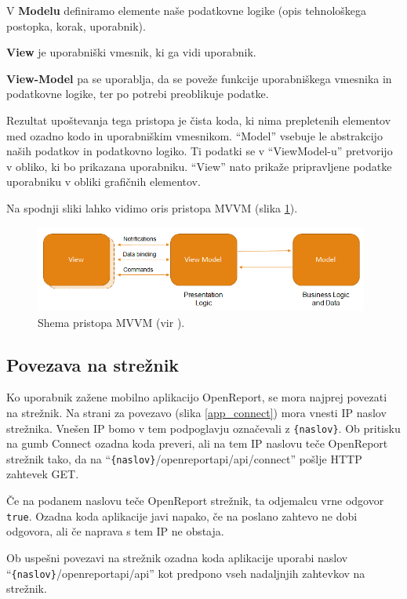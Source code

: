 \documentclass[a4paper, 12pt]{book}
\begin{document}
V \textbf{Modelu} definiramo elemente naše podatkovne logike (opis tehnološkega postopka, korak, uporabnik).

\textbf{View} je uporabniški vmesnik, ki ga vidi uporabnik.

\textbf{View-Model} pa se uporablja, da se poveže funkcije uporabniškega vmesnika in podatkovne logike, ter po potrebi preoblikuje podatke.

Rezultat upoštevanja tega pristopa je čista koda, ki nima prepletenih elementov med ozadno kodo in uporabniškim vmesnikom.
\enquote{Model} vsebuje le abstrakcijo naših podatkov in podatkovno logiko.
Ti podatki se v \enquote{ViewModel-u} pretvorijo v obliko, ki bo prikazana uporabniku.
\enquote{View} nato prikaže pripravljene podatke uporabniku v obliki grafičnih elementov.

Na spodnji sliki lahko vidimo oris pristopa MVVM (slika \ref{mvvm}).

\begin{figure}[H]
\begin{center}
\includegraphics[width=11cm]{mvvm}
\end{center}
	\caption{Shema pristopa MVVM (vir \cite{mvvmimage}).}
\label{mvvm}
\end{figure}

\subsection{Povezava na strežnik}

Ko uporabnik zažene mobilno aplikacijo OpenReport, se mora najprej povezati na strežnik.
Na strani za povezavo (slika \ref{app_connect}) mora vnesti IP naslov strežnika.
Vnešen IP bomo v tem podpoglavju označevali z \texttt{\{naslov\}}.
Ob pritisku na gumb Connect ozadna koda preveri, ali na tem IP naslovu teče OpenReport strežnik tako, da na \enquote{\texttt{\{naslov\}}/openreportapi/api/connect} pošlje HTTP zahtevek GET.

Če na podanem naslovu teče OpenReport strežnik, ta odjemalcu vrne odgovor \texttt{true}.
Ozadna koda aplikacije javi napako, če na poslano zahtevo ne dobi odgovora, ali če naprava s tem IP ne obstaja.

Ob uspešni povezavi na strežnik ozadna koda aplikacije uporabi naslov \enquote{\texttt{\{naslov\}}/openreportapi/api} kot predpono vseh nadaljnjih zahtevkov na strežnik.
\end{document}
